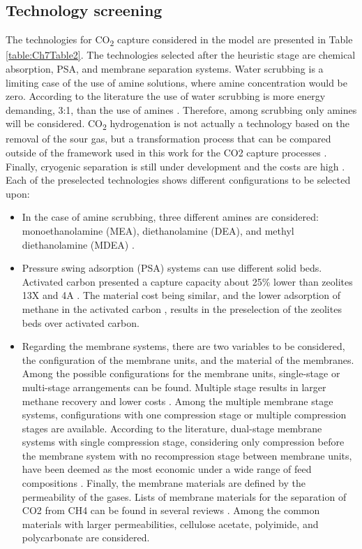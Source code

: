 \begin{refsection}[referencesCh7]
\subsection{Technology screening}
The technologies for CO\textsubscript{2} capture considered in the model are presented in Table \ref{table:Ch7Table2}. The technologies selected after the heuristic stage are chemical absorption, PSA, and membrane separation systems. Water scrubbing is a limiting case of the use of amine solutions, where amine concentration would be zero. According to the literature the use of water scrubbing is more energy demanding, 3:1, than the use of amines \citep{Pellegrini2015}. Therefore, among scrubbing only amines will be considered. CO\textsubscript{2} hydrogenation is not actually a technology based on the removal of
the sour gas, but a transformation process that can be compared outside of the framework used in this work for the CO2 capture processes \citep{curto2019renewable}. Finally, cryogenic separation is
still under development and the costs are high \citep{adnan2019technologies}. Each of the preselected technologies shows different configurations to be selected upon:

\begin{itemize}
	\item In the case of amine scrubbing, three different amines are considered: monoethanolamine (MEA), diethanolamine (DEA), and methyl diethanolamine (MDEA) \citep{2004gpsa}.
	\item Pressure swing adsorption (PSA) systems can use different solid beds. Activated carbon presented a capture capacity about 25\% lower than zeolites 13X and 4A \citep{hauchhum2014carbon}. The material cost being similar, and the lower adsorption of	methane in the activated carbon \citep{ferella2017separation}, results in the preselection of the zeolites beds over activated carbon.
	\item Regarding the membrane systems, there are two variables to be	considered, the configuration of the membrane units, and the	material of the membranes. Among the possible configurations for the membrane units, single-stage or multi-stage arrangements can be found. Multiple stage results in larger methane recovery and lower costs \citep{deng2010techno}. Among the multiple membrane stage systems, configurations with one compression stage \citep{makaruk2010membrane} or multiple compression stages \citep{molino2013biogas} are available. According to the literature, dual-stage membrane systems with single compression stage, considering only compression before the membrane	system with no recompression stage between membrane units,	have been deemed as the most economic under a wide range of	feed compositions \citep{kim2017optimization}. Finally, the membrane materials are defined by the permeability of the gases. Lists of membrane materials for the separation of CO2 from CH4 can be	found in several reviews \citep{zhang2013modeling, chen2015membrane, vrbova2017upgrading}. Among the common materials with larger permeabilities, cellulose acetate, polyimide, and polycarbonate are considered.
\end{itemize}


\end{refsection}
